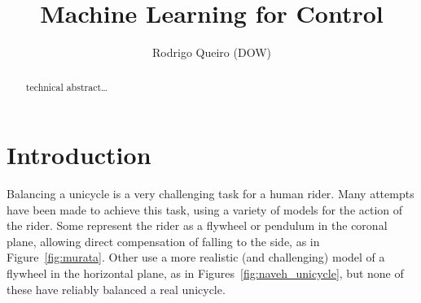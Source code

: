 \documentclass{IIBproject}
\begin{document}
\author{Rodrigo Queiro (DOW)}
\title{Machine Learning for Control}
\maketitle
\thispagestyle{empty}

\renewcommand{\abstractname}{Technical Abstract}
\begin{abstract}
  technical abstract\ldots
\end{abstract}
\pagestyle{plain}
\tableofcontents
\newpage

\section{Introduction} Balancing a unicycle is a very challenging task for a
human rider. Many attempts have been made to achieve this task, using a
variety of models for the action of the rider. Some represent the rider as a
flywheel or pendulum in the coronal plane, allowing direct compensation of
falling to the side\cite{ref:zenkov,ref:murata}, as in
Figure~\ref{fig:murata}. Other use a more realistic (and challenging) model of
a flywheel in the horizontal plane\cite{ref:vos,ref:naveh}, as in
Figures~\ref{fig:naveh_unicycle}, but none of these
have reliably balanced a real unicycle.
\end{document}
